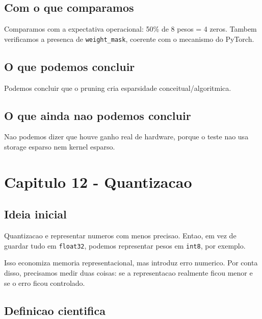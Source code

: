 \subsection{Com o que comparamos}




Comparamos com a expectativa operacional: 50\% de 8 pesos = 4 zeros. Tambem verificamos a presenca de \texttt{weight\_\allowbreak{}mask}, coerente com o mecanismo do PyTorch.



\subsection{O que podemos concluir}



Podemos concluir que o pruning cria esparsidade conceitual/algoritmica.



\subsection{O que ainda nao podemos concluir}




Nao podemos dizer que houve ganho real de hardware, porque o teste nao usa storage esparso nem kernel esparso.



\section{Capitulo 12 - Quantizacao}



\subsection{Ideia inicial}




Quantizacao e representar numeros com menos precisao. Entao, em vez de guardar tudo em \texttt{float32}, podemos representar pesos em \texttt{int8}, por exemplo.





Isso economiza memoria representacional, mas introduz erro numerico. Por conta disso, precisamos medir duas coisas: se a representacao realmente ficou menor e se o erro ficou controlado.



\subsection{Definicao cientifica}



